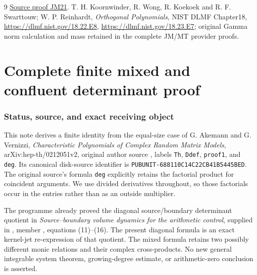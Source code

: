 \documentclass[11pt]{article}
\begin{document}
\begin{thebibliography}{9}
\href{https://github.com/KokunoYumeto/zeta-function-research-reader/blob/5992ad50c0f2a06921f1fcaded7b4e38097c0739/workbenches/splitzero-tandem/continuations/20260920-original-kernel-mixed-determinants/providers/JOINT_MINIMUM_RECEIVERS.tex\#L286}{Source proof JM21}.
 T. H. Koornwinder, R. Wong, R. Koekoek and R. F. Swarttouw;
W. P. Reinhardt, \emph{Orthogonal Polynomials}, NIST DLMF Chapter18,
\url{https://dlmf.nist.gov/18.22.E8},
\url{https://dlmf.nist.gov/18.23.E7}; original Gamma norm calculation
and mass retained in the complete JM/MT provider proofs.
\end{thebibliography}

\endgroup

\clearpage\begingroup
\part*{Complete finite mixed and confluent determinant proof}
\newtheorem{mrfinitetheorem}{Theorem}
\newtheorem{mrfinitelemma}[mrfinitetheorem]{Lemma}
\newcommand{\mrfiniteC}{\mathbb C}
\newcommand{\mrfiniteR}{\mathbb R}
\newcommand{\mrfinitePp}{\mathcal P}
\newcommand{\mrfinitedd}{\,d}



\section{Status, source, and exact receiving object}\label{mrfinite:sec:status}

This note derives a finite identity from the equal-size case of G. Akemann
and G. Vernizzi, \emph{Characteristic Polynomials of Complex Random Matrix
Models}, arXiv:hep-th/0212051v2, original author source
, labels \texttt{Th}, \texttt{Ddef},
\texttt{proof1}, and \texttt{deg}. Its canonical disk-source identifier is
\texttt{PUBUNIT-688110C14C22CB41B5445BED}. The original source's formula
\texttt{deg} explicitly retains the factorial product for coincident
arguments. We use divided derivatives throughout, so those factorials
occur in the entries rather than as an outside multiplier.

The programme already proved the diagonal source/boundary determinant
quotient in \emph{Source--boundary volume dynamics for the arithmetic
control}, supplied in ,
member , equations (11)--(16).
The present diagonal formula is an exact kernel-jet re-expression of
that quotient. The mixed formula retains two possibly different monic
relations and their complex cross-products. No new general integrable
system theorem, growing-degree estimate, or arithmetic-zero conclusion
is asserted.
\end{document}
